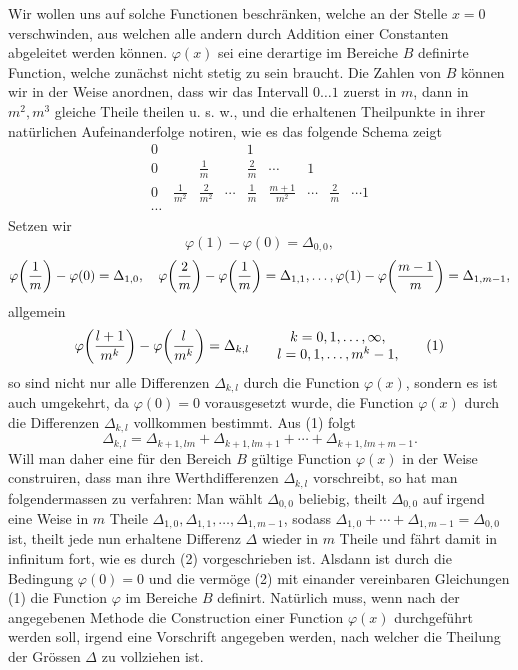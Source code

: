 \documentclass[11pt,a4paper]{article}
\begin{document}
Wir wollen uns auf solche Functionen beschränken, welche an der Stelle $x=0$ verschwinden, aus welchen alle andern durch Addition einer Constanten abgeleitet werden können. $\varphi(x)$ sei eine derartige im Bereiche $B$ definirte Function, welche zunächst nicht stetig zu sein braucht. Die Zahlen von $B$ können wir in der Weise anordnen, dass wir das Intervall $0\ldots1$ zuerst in $m$, dann in $m^2,m^3$ gleiche Theile theilen u. s. w., und die erhaltenen Theilpunkte in ihrer natürlichen Aufeinanderfolge notiren, wie es das folgende Schema zeigt
\[
\begin{array}{ccccccccc}
0&&&&1\\[2mm]
0&&\frac1m&&\frac2m&\cdots&1\\[2mm]
0&\frac1{m^2}&\frac2{m^2}&\cdots&\frac1m&\frac{m+1}{m^2}&\cdots&\frac2m&\cdots 1\\
\cdots&&&&&&&&
\end{array}
\]
Setzen wir
\[
\varphi(1)-\varphi(0)=\Delta_{0,0},
\]
\[
 \varphi\!\left({1\over m}\right)-\varphi(0)=\Delta_{1,0},\quad
 \varphi\!\left({2\over m}\right)-\varphi\!\left({1\over m}\right)=\Delta_{1,1},\ldots,
 \varphi(1)-\varphi\!\left({m-1\over m}\right)=\Delta_{1,m-1},
\]
allgemein
\begin{equation}
\varphi\!\left({l+1\over m^k}\right)-\varphi\!\left({l\over m^k}\right)=\Delta_{k,l}
\qquad
\begin{matrix}
 k=0,1,\ldots,\infty,\\
 l=0,1,\ldots,m^k-1,
\end{matrix}
\tag{1}
\end{equation}
so sind nicht nur alle Differenzen $\Delta_{k,l}$ durch die Function $\varphi(x)$, sondern es ist auch umgekehrt, da $\varphi(0)=0$ vorausgesetzt wurde, die Function $\varphi(x)$ durch die Differenzen $\Delta_{k,l}$ vollkommen bestimmt. Aus (1) folgt
\begin{equation}
 \Delta_{k,l}=\Delta_{k+1,lm}+\Delta_{k+1,lm+1}+\cdots+\Delta_{k+1,lm+m-1}.
\tag{2}
\end{equation}
Will man daher eine für den Bereich $B$ gültige Function $\varphi(x)$ in der Weise construiren, dass man ihre Werthdifferenzen $\Delta_{k,l}$ vorschreibt, so hat man folgendermassen zu verfahren: Man wählt $\Delta_{0,0}$ beliebig, theilt $\Delta_{0,0}$ auf irgend eine Weise in $m$ Theile $\Delta_{1,0},\Delta_{1,1},\ldots,\Delta_{1,m-1}$, sodass $\Delta_{1,0}+\cdots+\Delta_{1,m-1}=\Delta_{0,0}$ ist, theilt jede nun erhaltene Differenz $\Delta$ wieder in $m$ Theile und fährt damit in infinitum fort, wie es durch (2) vorgeschrieben ist. Alsdann ist durch die Bedingung $\varphi(0)=0$ und die vermöge (2) mit einander vereinbaren Gleichungen (1) die Function $\varphi$ im Bereiche $B$ definirt. Natürlich muss, wenn nach der angegebenen Methode die Construction einer Function $\varphi(x)$ durchgeführt werden soll, irgend eine Vorschrift angegeben werden, nach welcher die Theilung der Grössen $\Delta$ zu vollziehen ist.
\end{document}
